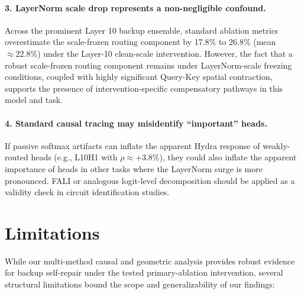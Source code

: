 \documentclass[12pt,a4paper]{article}
\begin{document}
\paragraph{3. LayerNorm scale drop represents a non-negligible confound.}
Across the prominent Layer 10 backup ensemble, standard ablation metrics overestimate the scale-frozen routing component by 17.8\% to 26.8\% (mean $\approx 22.8\%$) under the Layer-10 clean-scale intervention. However, the fact that a robust scale-frozen routing component remains under LayerNorm-scale freezing conditions, coupled with highly significant Query-Key spatial contraction, supports the presence of intervention-specific compensatory pathways in this model and task.

\paragraph{4. Standard causal tracing may misidentify ``important'' heads.}
If passive softmax artifacts can inflate the apparent Hydra response of
weakly-routed heads (e.g., L10H1 with $\rho \approx +3.8\%$), they could also
inflate the apparent importance of heads in other tasks where the LayerNorm
surge is more pronounced. FALI or analogous logit-level decomposition should be
applied as a validity check in circuit identification studies.

\section{Limitations}
\label{sec:limitations}

While our multi-method causal and geometric analysis provides robust evidence for backup self-repair under the tested primary-ablation intervention, several structural limitations bound the scope and generalizability of our findings:
\end{document}
